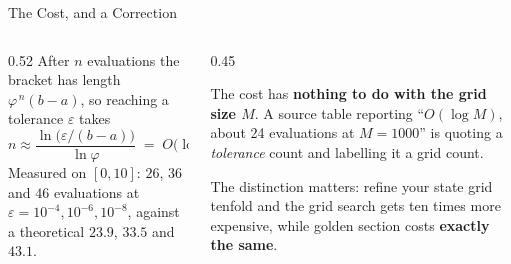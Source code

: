 \begin{frame}{The Cost, and a Correction}
\begin{columns}[T]
\begin{column}{0.52\textwidth}
\small
After $n$ evaluations the bracket has length $\varphi^{\,n}(b-a)$, so reaching a tolerance $\varepsilon$ takes
\[
  n \approx \frac{\ln\big(\varepsilon/(b-a)\big)}{\ln\varphi}
  \;=\; O\!\Big(\log\tfrac1\varepsilon\Big).
\]
Measured on $[0,10]$: $26$, $36$ and $46$ evaluations at $\varepsilon=10^{-4},10^{-6},10^{-8}$, against a theoretical $23.9$, $33.5$ and $43.1$.
\end{column}
\begin{column}{0.45\textwidth}
\begin{cautionbox}[title=\textbf{It is not $O(\log M)$}]\small
The cost has \textbf{nothing to do with the grid size $M$}. A source table reporting ``$O(\log M)$, about 24 evaluations at $M=1000$'' is quoting a \emph{tolerance} count and labelling it a grid count.
\end{cautionbox}
\medskip
\begin{takeawaybox}\footnotesize
The distinction matters: refine your state grid tenfold and the grid search gets ten times more expensive, while golden section costs \textbf{exactly the same}.
\end{takeawaybox}
\end{column}
\end{columns}
\end{frame}


